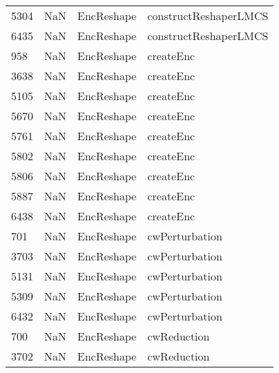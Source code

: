 \begin{tabular}{llll}
5304 &                   NaN &                 EncReshape &                     constructReshaperLMCS \\
6435 &                   NaN &                 EncReshape &                     constructReshaperLMCS \\
958  &                   NaN &                 EncReshape &                                 createEnc \\
3638 &                   NaN &                 EncReshape &                                 createEnc \\
5105 &                   NaN &                 EncReshape &                                 createEnc \\
5670 &                   NaN &                 EncReshape &                                 createEnc \\
5761 &                   NaN &                 EncReshape &                                 createEnc \\
5802 &                   NaN &                 EncReshape &                                 createEnc \\
5806 &                   NaN &                 EncReshape &                                 createEnc \\
5887 &                   NaN &                 EncReshape &                                 createEnc \\
6438 &                   NaN &                 EncReshape &                                 createEnc \\
701  &                   NaN &                 EncReshape &                            cwPerturbation \\
3703 &                   NaN &                 EncReshape &                            cwPerturbation \\
5131 &                   NaN &                 EncReshape &                            cwPerturbation \\
5309 &                   NaN &                 EncReshape &                            cwPerturbation \\
6432 &                   NaN &                 EncReshape &                            cwPerturbation \\
700  &                   NaN &                 EncReshape &                               cwReduction \\
3702 &                   NaN &                 EncReshape &                               cwReduction \\

\end{tabular}
